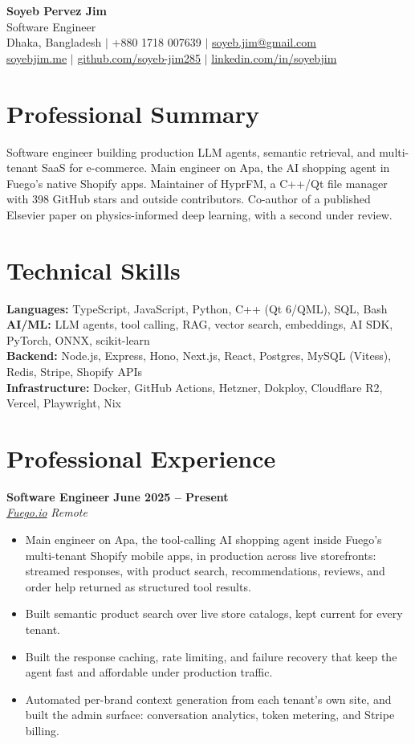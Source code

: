 \documentclass[10pt,a4paper]{article}
\newcommand{\role}[4]{%
  \textbf{#1} \hfill \textbf{#2}\\[-1pt]
  \textit{#3} \hfill \textit{#4}
}
\begin{document}
\begin{center}
  {\LARGE\bfseries Soyeb Pervez Jim}\\[2pt]
  {\large Software Engineer}\\[3pt]
  Dhaka, Bangladesh \enspace $|$ \enspace +880 1718 007639 \enspace $|$ \enspace
  \href{mailto:soyeb.jim@gmail.com}{soyeb.jim@gmail.com}\\[1pt]
  \href{https://soyebjim.me}{soyebjim.me} \enspace $|$ \enspace
  \href{https://github.com/soyeb-jim285}{github.com/soyeb-jim285} \enspace $|$ \enspace
  \href{https://www.linkedin.com/in/soyebjim}{linkedin.com/in/soyebjim}
\end{center}

\section*{Professional Summary}
Software engineer building production LLM agents, semantic retrieval, and multi-tenant SaaS for e-commerce. Main engineer on Apa, the AI shopping agent in Fuego's native Shopify apps. Maintainer of HyprFM, a C++/Qt file manager with 398 GitHub stars and outside contributors. Co-author of a published Elsevier paper on physics-informed deep learning, with a second under review.

\section*{Technical Skills}
\textbf{Languages:} TypeScript, JavaScript, Python, C++ (Qt 6/QML), SQL, Bash\\
\textbf{AI/ML:} LLM agents, tool calling, RAG, vector search, embeddings, AI SDK, PyTorch, ONNX, scikit-learn\\
\textbf{Backend:} Node.js, Express, Hono, Next.js, React, Postgres, MySQL (Vitess), Redis, Stripe, Shopify APIs\\
\textbf{Infrastructure:} Docker, GitHub Actions, Hetzner, Dokploy, Cloudflare R2, Vercel, Playwright, Nix

\section*{Professional Experience}
\role{Software Engineer}{June 2025 -- Present}{\href{https://fuego.io}{Fuego.io}}{Remote}
\begin{itemize}
  \item Main engineer on Apa, the tool-calling AI shopping agent inside Fuego's multi-tenant Shopify mobile apps, in production across live storefronts: streamed responses, with product search, recommendations, reviews, and order help returned as structured tool results.
  \item Built semantic product search over live store catalogs, kept current for every tenant.
  \item Built the response caching, rate limiting, and failure recovery that keep the agent fast and affordable under production traffic.
  \item Automated per-brand context generation from each tenant's own site, and built the admin surface: conversation analytics, token metering, and Stripe billing.
\end{itemize}
\end{document}
